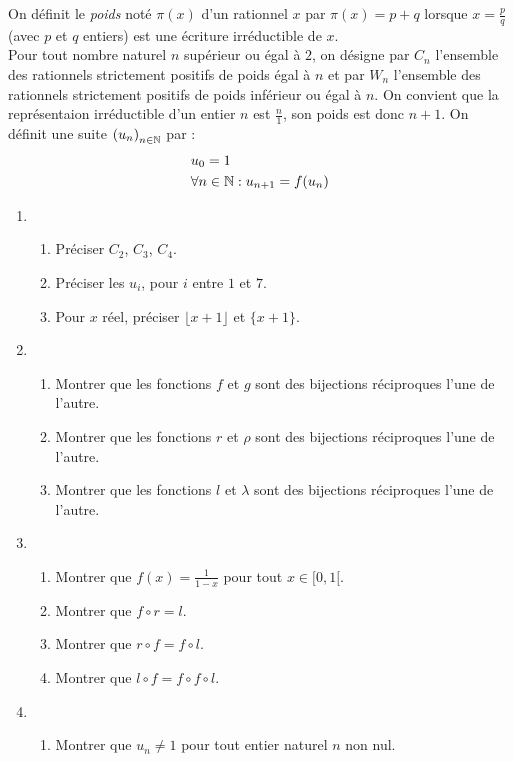 On définit le \emph{poids} noté $\pi(x)$ d'un rationnel $x$ par $\pi(x)=p+q$ lorsque $x=\frac{p}{q}$ (avec $p$ et $q$ entiers) est une écriture irréductible de $x$.\\ Pour tout nombre naturel $n$ supérieur ou égal à $2$, on désigne par $C_n$ l'ensemble des rationnels strictement positifs de poids égal à $n$ et par $W_n$ l'ensemble des rationnels strictement positifs de poids inférieur ou égal à $n$. On convient que la représentaion irréductible d'un entier $n$ est $\frac{n}{1}$, son poids est donc $n+1$.\newline
On définit une suite $\left( u_n\right) _{n\in \mathbb{N}}$ par :
\begin{align*}
 &u_0 =1 \\
&\forall n\in \mathbb{N} : u_{n+1}=f(u_n)
\end{align*}
\begin{enumerate}
 \item
\begin{enumerate}
  \item Préciser $C_2$, $C_3$, $C_4$.
  \item Préciser les $u_i$, pour $i$ entre $1$ et $7$.
  \item Pour $x$ réel, préciser $\lfloor x+1\rfloor$ et $\{x+1\}$. 
\end{enumerate}
\item
\begin{enumerate}
 \item Montrer que les fonctions $f$ et $g$ sont des bijections réciproques l'une de l'autre. 
 \item Montrer que les fonctions $r$ et $\rho$ sont des bijections réciproques l'une de l'autre.
 \item Montrer que les fonctions $l$ et $\lambda$ sont des bijections réciproques l'une de l'autre.
\end{enumerate}
\item
\begin{enumerate}
 \item Montrer que $f(x)=\frac{1}{1-x}$ pour tout $x\in[0,1[$.
 \item Montrer que $f\circ r = l$.
 \item Montrer que $r\circ f  = f\circ l$.
 \item Montrer que $l\circ f = f\circ f \circ l$.
\end{enumerate}
\item 
\begin{enumerate}
 \item Montrer que $u_n\neq1$ pour tout entier naturel $n$ non nul.

\end{enumerate}
\end{enumerate}
